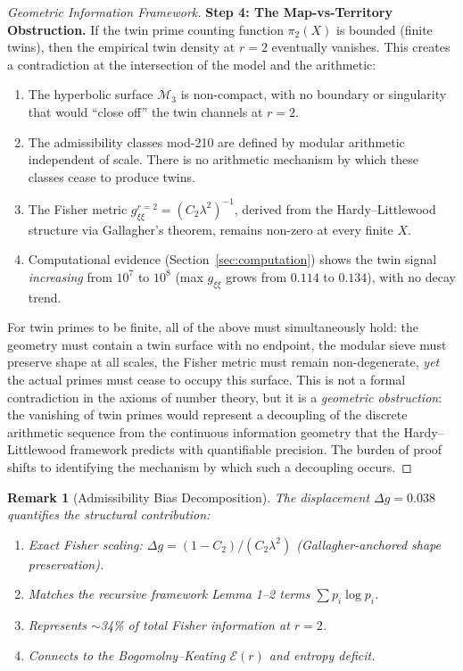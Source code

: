 \documentclass[12pt]{article}
\newtheorem{remark}[theorem]{Remark}
\begin{document}
\begin{proof}[Geometric Information Framework]
\textbf{Step 4: The Map-vs-Territory Obstruction.}
If the twin prime counting function $\pi_2(X)$ is bounded (finite twins), then
the empirical twin density at $r=2$ eventually vanishes. This creates a
contradiction at the intersection of the model and the arithmetic:
\begin{enumerate}
  \item The hyperbolic surface $\mathcal{M}_3$ is non-compact, with no
    boundary or singularity that would ``close off'' the twin channels at $r=2$.
  \item The admissibility classes mod-210 are defined by modular arithmetic
    independent of scale. There is no arithmetic mechanism by which these
    classes cease to produce twins.
  \item The Fisher metric $g_{\xi\xi}^{r=2} = (C_2\lambda^2)^{-1}$, derived
    from the Hardy--Littlewood structure via Gallagher's theorem, remains
    non-zero at every finite $X$.
  \item Computational evidence (Section~\ref{sec:computation}) shows the
    twin signal \textit{increasing} from $10^7$ to $10^8$ (max $g_{\xi\xi}$
    grows from $0.114$ to $0.134$), with no decay trend.
\end{enumerate}
For twin primes to be finite, all of the above must simultaneously hold:
the geometry must contain a twin surface with no endpoint, the modular sieve
must preserve shape at all scales, the Fisher metric must remain non-degenerate,
\textit{yet} the actual primes must cease to occupy this surface. This is not
a formal contradiction in the axioms of number theory, but it is a
\textit{geometric obstruction}: the vanishing of twin primes would represent
a decoupling of the discrete arithmetic sequence from the continuous
information geometry that the Hardy--Littlewood framework predicts with
quantifiable precision. The burden of proof shifts to identifying the mechanism
by which such a decoupling occurs.
\end{proof}

\begin{remark}[Admissibility Bias Decomposition]
The displacement $\Delta g = 0.038$ quantifies the structural contribution:
\begin{enumerate}
  \item Exact Fisher scaling: $\Delta g = (1-C_2)/(C_2\lambda^2)$
    (Gallagher-anchored shape preservation).
  \item Matches the recursive framework Lemma 1--2 terms $\sum p_i \log p_i$.
  \item Represents $\sim$34\% of total Fisher information at $r=2$.
  \item Connects to the Bogomolny--Keating $\mathcal{E}(r)$ and entropy deficit.
\end{enumerate}
\end{remark}
\end{document}
